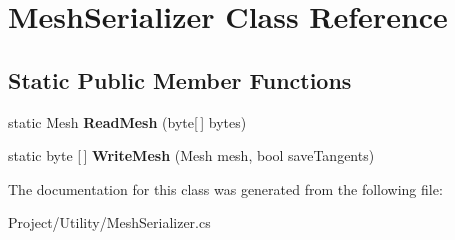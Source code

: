 \hypertarget{class_mesh_serializer}{}\section{Mesh\+Serializer Class Reference}
\label{class_mesh_serializer}
\subsection*{Static Public Member Functions}
\begin{DoxyCompactItemize}
\item 
\mbox{\label{class_mesh_serializer_a1c6aef0dba2aaa2dc8724f6e50b0ea6d}} 
static Mesh {\bfseries Read\+Mesh} (byte\mbox{[}$\,$\mbox{]} bytes)
\item 
\mbox{\label{class_mesh_serializer_a7e90d8200b8ac6c34a867a0e5eb47363}} 
static byte \mbox{[}$\,$\mbox{]} {\bfseries Write\+Mesh} (Mesh mesh, bool save\+Tangents)
\end{DoxyCompactItemize}


The documentation for this class was generated from the following file\+:\begin{DoxyCompactItemize}
\item 
Project/\+Utility/Mesh\+Serializer.\+cs\end{DoxyCompactItemize}
